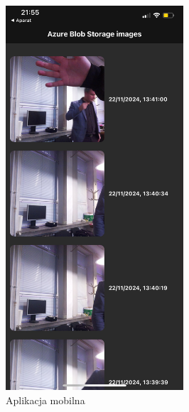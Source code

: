 \documentclass{article}
\begin{document}
\begin{figure}[H]
\centering
\includegraphics[width=2.60417in,height=\textheight,keepaspectratio]{images/mobile-app.JPG}
\caption{Aplikacja mobilna}
\end{figure}
\end{document}
